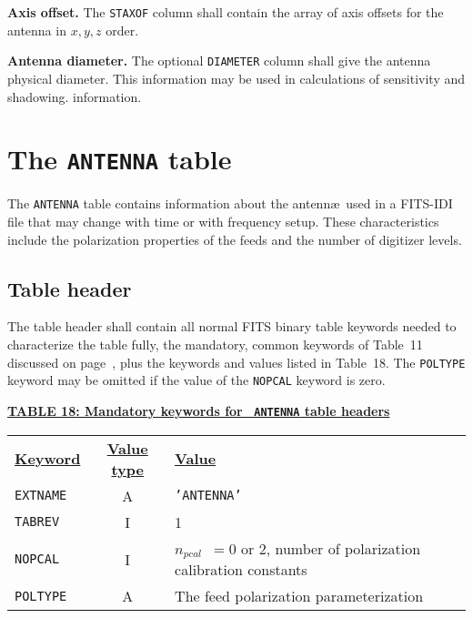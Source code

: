 \documentclass[twoside]{article}
\newcommand{\Hi}[1]{\textcolor{hicol}{#1}}
\newcommand{\mecol}{\color{mecol}}
\newcommand{\hblack}{\color{black}}
\newcommand{\npcal}{$n_{pcal}$}
\begin{document}
{\bf Axis offset.}  The {\tt STAXOF} column shall contain the
\Hi{array of} axis offsets for the antenna \Hi{in $x,y,z$ order}.

\mecol
{\bf Antenna diameter.} The optional {\tt DIAMETER} column shall give
the antenna physical diameter.  This information may be used in
calculations of sensitivity and shadowing.
information.
\hblack

\section{The {\tt ANTENNA} table}
\label{s:AN}

The {\tt ANTENNA} table contains information about the antenn\ae\ used
in a FITS-IDI file that may change with time or with frequency setup.
These characteristics include the polarization properties of the
feeds and the number of digitizer levels.

\subsection{Table header}

\Hi{The table header shall contain all normal FITS binary table
keywords needed to characterize the table fully, the mandatory, common
keywords of Table~11 discussed on page~\pageref{ta:keywords}, plus the
keywords and values listed in Table~\Hi{18}.  The {\tt POLTYPE}
keyword may be omitted if the value of the {\tt NOPCAL} keyword is
zero.}

\begin{center}
\underline{\bf{TABLE \Hi{18}: Mandatory keywords for {\tt
    ANTENNA} table headers}}\\
\begin{tabular}{lcl}
\noalign{\vspace{2pt}}
\underline{{\bf Keyword}} & \underline{\bf{Value type}} &
    \underline{\bf{Value\vphantom{y}}} \\
\noalign{\vspace{2pt}}
{\tt EXTNAME}   & A & {\tt 'ANTENNA'}  \\
{\tt TABREV}    & I & 1 \\
{\tt NOPCAL}    & I & \npcal\ $= 0$ or $2$, number of polarization
                      calibration constants \\
{\tt POLTYPE}   & A & The feed polarization parameterization \\
\end{tabular}
\end{center}
\end{document}
